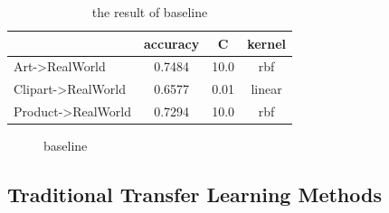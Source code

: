 \documentclass[conference]{IEEEtran}
\begin{document}
\begin{table}[htbp]
	\centering
	\caption{the result of baseline}
\begin{tabular}{|l|c|c|c|}
	\hline
	\diagbox{dataset}{result} & accuracy & C & kernel \\
	\hline
	Art->RealWorld & 0.7484  & 10.0 & rbf \\
	\hline
	Clipart->RealWorld & 0.6577 & 0.01 & linear \\
	\hline
	Product->RealWorld & 0.7294 & 10.0 & rbf \\
	\hline
\end{tabular}\label{tab:base}
\end{table}

\begin{center}
	\begin{figure}[htbp]
		\centering
		\quad
		\quad
		\caption{baseline}
		\label{fig:base}
	\end{figure}
\end{center}

\subsection{Traditional Transfer Learning Methods}
\end{document}
